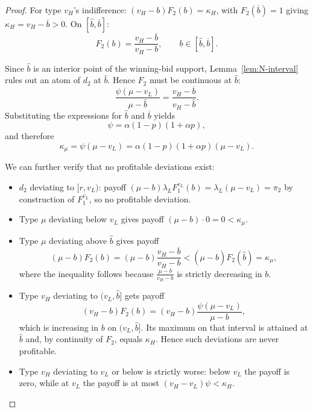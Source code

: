 \documentclass[11pt]{article}
\theoremstyle{plain}
\theoremstyle{definition}
\theoremstyle{plain}
\theoremstyle{plain}
\theoremstyle{plain}
\theoremstyle{plain}
\numberwithin{equation}{section}
\begin{document}
\begin{proof}
\noindent For type $v_H$'s indifference: $(v_H - b)F_2(b) = \kappa_H$, with $F_2(\overline{b}) = 1$ giving $\kappa_H = v_H - \overline{b} > 0$. On $[\hat{b}, \overline{b}]$:
\[
F_2(b) = \frac{v_H - \overline{b}}{v_H - b}, \qquad b \in [\hat{b}, \overline{b}].
\]

\noindent Since $\hat{b}$ is an interior point of the winning-bid support, Lemma~\ref{lem:N-interval} rules out an atom of $d_2$ at $\hat{b}$. Hence $F_2$ must be continuous at $\hat{b}$:
\[
\frac{\psi(\mu - v_L)}{\mu - \hat{b}} = \frac{v_H - \overline{b}}{v_H - \hat{b}}.
\]
Substituting the expressions for $\hat{b}$ and $\overline{b}$ yields
\[
\psi = \alpha(1-p)(1+\alpha p),
\]
and therefore
\[
\kappa_{\mu} = \psi(\mu - v_L) = \alpha(1-p)(1+\alpha p)(\mu - v_L).
\]

\vspace{0.2cm}

\noindent We can further verify that no profitable deviations exist:
\begin{itemize}
    \item $d_2$ deviating to $[r, v_L)$: payoff $(\mu - b)\lambda_L F_1^{v_L}(b) = \lambda_L(\mu - v_L) = \pi_2$ by construction of $F_1^{v_L}$, so no profitable deviation.
    \item Type $\mu$ deviating below $v_L$ gives payoff $(\mu - b) \cdot 0 = 0 < \kappa_{\mu}$.
    \item Type $\mu$ deviating above $\hat{b}$ gives payoff
    \[
    (\mu - b)F_2(b) = (\mu - b)\frac{v_H - \overline{b}}{v_H - b} < (\mu - \hat{b})F_2(\hat{b}) = \kappa_{\mu},
    \]
    where the inequality follows because $\frac{\mu-b}{v_H-b}$ is strictly decreasing in $b$.
    \item Type $v_H$ deviating to $(v_L, \hat{b}]$ gets payoff
    \[
    (v_H - b)F_2(b) = (v_H - b)\frac{\psi(\mu - v_L)}{\mu - b},
    \]
    which is increasing in $b$ on $(v_L,\hat{b}]$. Its maximum on that interval is attained at $\hat{b}$ and, by continuity of $F_2$, equals $\kappa_H$. Hence such deviations are never profitable.
    \item Type $v_H$ deviating to $v_L$ or below is strictly worse: below $v_L$ the payoff is zero, while at $v_L$ the payoff is at most $(v_H - v_L)\psi < \kappa_H$.
\end{itemize}
\end{proof}
\vspace{0.2cm}
\end{document}
